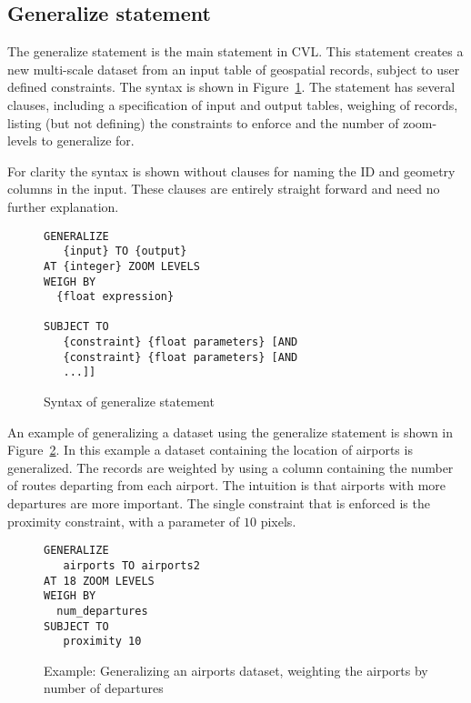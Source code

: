 \subsection{Generalize statement}
\label{sec:generalize-statement}

The generalize statement is the main statement in CVL. This statement creates a new multi-scale dataset from an input table of geospatial records, subject to user defined constraints. The syntax is shown in Figure~\ref{fig:generalize-syntax}. The statement has several clauses, including a specification of input and output tables, weighing of records, listing (but not defining) the constraints to enforce and the number of zoom-levels to generalize for. 

For clarity the syntax is shown without clauses for naming the ID and geometry columns in the input. These clauses are entirely straight forward and need no further explanation.

\begin{figure}[htbp]
\begin{center}
\begin{lstlisting}
GENERALIZE 
   {input} TO {output}
AT {integer} ZOOM LEVELS
WEIGH BY
  {float expression}

SUBJECT TO 
   {constraint} {float parameters} [AND
   {constraint} {float parameters} [AND
   ...]]
\end{lstlisting}
\caption{Syntax of generalize statement}
\label{fig:generalize-syntax}
\end{center}
\end{figure}

An example of generalizing a dataset using the generalize statement is shown in Figure~\ref{fig:cvl-example-airports}. In this example a dataset containing the location of airports is generalized. The records are weighted by using a column containing the number of routes departing from each airport. The intuition is that airports with more departures are more important. The single constraint that is enforced is the proximity constraint, with a parameter of $10$ pixels.

\begin{figure}[htbp]
\begin{center}
\begin{lstlisting}
GENERALIZE 
   airports TO airports2
AT 18 ZOOM LEVELS
WEIGH BY
  num_departures
SUBJECT TO 
   proximity 10 
\end{lstlisting}
\caption{Example: Generalizing an airports dataset, weighting the airports by number of departures}
\label{fig:cvl-example-airports}
\end{center}
\end{figure}


